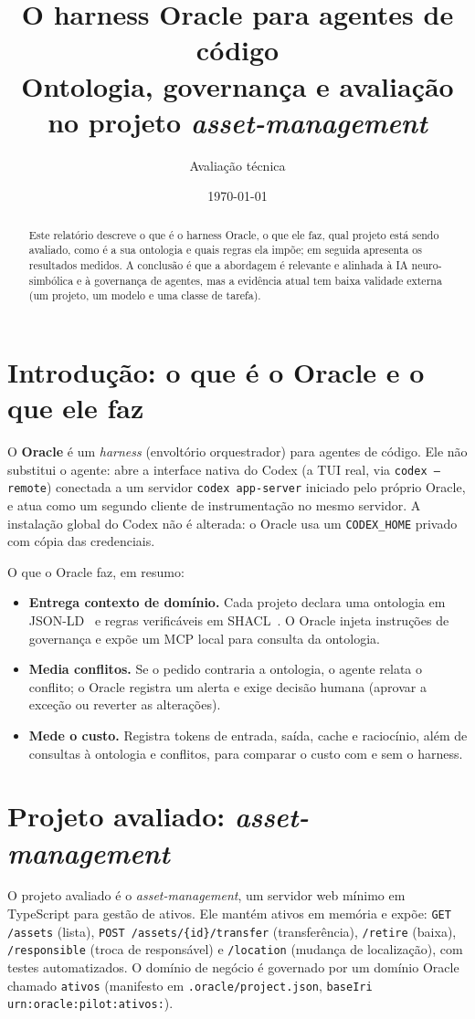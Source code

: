 \documentclass[11pt,a4paper]{article}
\title{O harness Oracle para agentes de código\\\large Ontologia, governança e avaliação no projeto \emph{asset-management}}
\author{Avaliação técnica}
\date{\today}
\begin{document}
\maketitle

\begin{abstract}
Este relatório descreve o que é o harness Oracle, o que ele faz, qual projeto está sendo avaliado, como é a sua ontologia e quais regras ela impõe; em seguida apresenta os resultados medidos. A conclusão é que a abordagem é relevante e alinhada à IA neuro-simbólica e à governança de agentes, mas a evidência atual tem baixa validade externa (um projeto, um modelo e uma classe de tarefa).
\end{abstract}

\section{Introdução: o que é o Oracle e o que ele faz}
O \textbf{Oracle} é um \emph{harness} (envoltório orquestrador) para agentes de código. Ele não substitui o agente: abre a interface nativa do Codex (a TUI real, via \texttt{codex --remote}) conectada a um servidor \texttt{codex app-server} iniciado pelo próprio Oracle, e atua como um segundo cliente de instrumentação no mesmo servidor. A instalação global do Codex não é alterada: o Oracle usa um \texttt{CODEX\_HOME} privado com cópia das credenciais.

O que o Oracle faz, em resumo:
\begin{itemize}[leftmargin=1.4em]
\item \textbf{Entrega contexto de domínio.} Cada projeto declara uma ontologia em JSON-LD~\cite{w3c-jsonld} e regras verificáveis em SHACL~\cite{w3c-shacl}. O Oracle injeta instruções de governança e expõe um MCP local para consulta da ontologia.
\item \textbf{Media conflitos.} Se o pedido contraria a ontologia, o agente relata o conflito; o Oracle registra um alerta e exige decisão humana (aprovar a exceção ou reverter as alterações).
\item \textbf{Mede o custo.} Registra tokens de entrada, saída, cache e raciocínio, além de consultas à ontologia e conflitos, para comparar o custo com e sem o harness.
\end{itemize}

\section{Projeto avaliado: \emph{asset-management}}
O projeto avaliado é o \emph{asset-management}, um servidor web mínimo em TypeScript para gestão de ativos. Ele mantém ativos em memória e expõe: \texttt{GET /assets} (lista), \texttt{POST /assets/\{id\}/transfer} (transferência), \texttt{/retire} (baixa), \texttt{/responsible} (troca de responsável) e \texttt{/location} (mudança de localização), com testes automatizados. O domínio de negócio é governado por um domínio Oracle chamado \texttt{ativos} (manifesto em \texttt{.oracle/project.json}, \texttt{baseIri} \texttt{urn:oracle:pilot:ativos:}).
\end{document}
